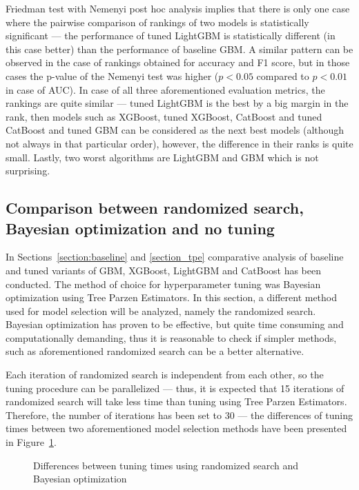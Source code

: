 \documentclass[magisterska, english]{pwr_wmat_praca_dyplomowa}
\theoremstyle{plain}
\numberwithin{theorem}{chapter}
\theoremstyle{definition}
\numberwithin{theorem}{chapter}
\begin{document}
Friedman test with Nemenyi post hoc analysis implies that there is only one case where the pairwise comparison of rankings of two models is statistically significant --- the performance of tuned LightGBM is statistically different (in this case better) than the performance of baseline GBM. A similar pattern can be observed in the case of rankings obtained for accuracy and F1 score, but in those cases the p-value of the Nemenyi test was higher ($p<0.05$ compared to $p<0.01$ in case of AUC). In case of all three aforementioned evaluation metrics, the rankings are quite similar --- tuned LightGBM is the best by a big margin in the rank, then models such as XGBoost, tuned XGBoost, CatBoost and tuned CatBoost and tuned GBM can be considered as the next best models (although not always in that particular order), however, the difference in their ranks is quite small. Lastly, two worst algorithms are LightGBM and GBM which is not surprising.

\subsection{Comparison between randomized search, Bayesian optimization and no tuning}\label{section_rand}
In Sections~\ref{section:baseline} and \ref{section_tpe} comparative analysis of baseline and tuned variants of GBM, XGBoost, LightGBM and CatBoost has been conducted. The method of choice for hyperparameter tuning was Bayesian optimization using Tree Parzen Estimators. In this section, a different method used for model selection will be analyzed, namely the randomized search. Bayesian optimization has proven to be effective, but quite time consuming and computationally demanding, thus it is reasonable to check if simpler methods, such as aforementioned randomized search can be a better alternative.

Each iteration of randomized search is independent from each other, so the tuning procedure can be parallelized --- thus, it is expected that 15 iterations of randomized search will take less time than tuning using Tree Parzen Estimators. Therefore, the number of iterations has been set to 30 --- the differences of tuning times between two aforementioned model selection methods have been presented in Figure~\ref{fig:diffs}.

\begin{figure}[H]
	\centering
	\caption{Differences between tuning times using randomized search and Bayesian optimization}
	\label{fig:diffs}
\end{figure}
\end{document}
